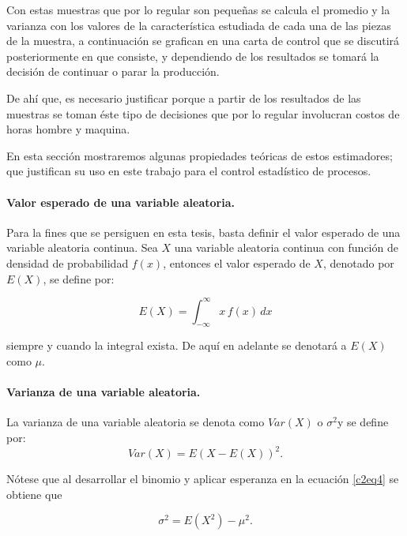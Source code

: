 \documentclass[spanish]{report}
\begin{document}
Con estas muestras que por lo regular son pequeñas se calcula el promedio
y la varianza con los valores de la característica estudiada de cada
una de las piezas de la muestra, a continuación se grafican en una
carta de control que se discutirá posteriormente en que consiste,
y dependiendo de los resultados se tomará la decisión de continuar
o parar la producción.

De ahí que, es necesario justificar porque a partir de los resultados
de las muestras se toman éste tipo de decisiones que por lo regular involucran
costos de horas hombre y maquina. 

En esta sección mostraremos algunas propiedades teóricas de estos
estimadores; que justifican su uso en este trabajo para el control
estadístico de procesos.


\paragraph{Valor esperado de una variable aleatoria.}

Para la fines que se persiguen en esta tesis, basta definir el valor
esperado de una variable aleatoria continua. Sea $X$ una variable
aleatoria continua con función de densidad de probabilidad $f(x)$,
entonces el valor esperado de $X$, denotado por $E(X)$, se define
por:

\begin{equation}
E(X)=\int_{-\infty}^{\infty}x\,f(x)\,dx
\label{c2eq3}
\end{equation}


siempre y cuando la integral exista. De aquí en adelante se denotará
a $E(X)$ como $\mu.$


\paragraph{Varianza de una variable aleatoria.}

La varianza de una variable aleatoria se denota como $Var(X)$ o $\sigma^{2}$y
se define por:
\begin{equation}
Var(X)=E(X-E(X))^{2}. \label{c2eq4}
\end{equation}


Nótese que al desarrollar el binomio y aplicar esperanza en la ecuación
\ref{c2eq4} se obtiene que

\begin{equation}
\sigma^{2}=E(X^{2})-\mu^{2}.
\label{c2eq5}
\end{equation}
\end{document}
